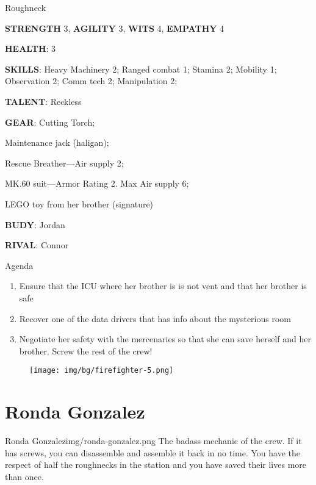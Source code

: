 \begin{rpg-commentbox}{}
    Roughneck

    \textbf{STRENGTH} 3, \textbf{AGILITY} 3, \textbf{WITS} 4, \textbf{EMPATHY} 4

    \textbf{HEALTH}: 3

    \textbf{SKILLS}: Heavy Machinery 2; Ranged combat 1; Stamina 2; Mobility 1; Observation 2; Comm tech 2; Manipulation 2;
    
    \textbf{TALENT}: Reckless
    
    \textbf{GEAR}: Cutting Torch;
    
    Maintenance jack (haligan);
    
    Rescue Breather---Air supply 2;
    
    MK.60 suit---Armor Rating 2. Max Air supply 6;  
    
    LEGO toy from her brother (signature)

    \textbf{BUDY}: Jordan
    
    \textbf{RIVAL}: Connor
\end{rpg-commentbox}

\begin{rpg-commentbox}{Agenda}
    \begin{enumerate}[label=\textbf{Act \arabic*}, leftmargin=1cm]
        \item Ensure that the ICU where her brother is is not vent and that her brother is safe
        \item Recover one of the data drivers that has info about the mysterious room
        \item Negotiate her safety with the mercenaries so that she can save herself and her brother. Screw the rest of the crew!
    \end{enumerate}
\end{rpg-commentbox}


\begin{figure}
    \hspace*{-1in}
    \texttt{[image: img/bg/firefighter-5.png]}
    \label{fig:refinery}
\end{figure}


\newsect

\clearpage

\section{Ronda Gonzalez}

\begin{rpg-pcbox}{Ronda Gonzalez}{img/ronda-gonzalez.png}
    The badass mechanic of the crew. If it has screws, you can disassemble and assemble it back in no time. You have the respect of half the roughnecks in the station and you have saved their lives more than once. 
\end{rpg-pcbox}

